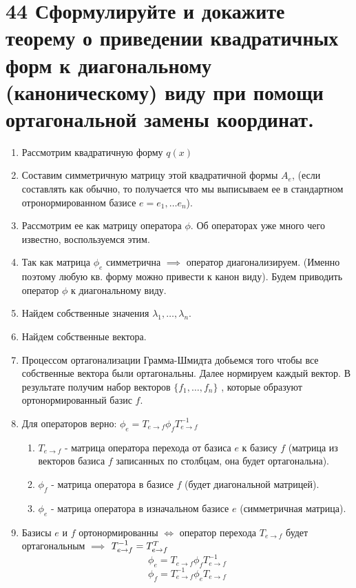 \documentclass[a4paper,12pt]{article}
\begin{document}
\section{44 Сформулируйте и докажите теорему о приведении квадратичных форм к диагональному (каноническому) виду при помощи ортагональной замены координат. }
\begin{enumerate}
\item Рассмотрим квадратичную форму $q(x)$
\item Составим симметричную матрицу этой квадратичной формы $A_e$, 
(если составлять как обычно, то получается что мы выписываем ее в стандартном отронормированном базисе $e = {e_1, \dots e_n }$).
\item Рассмотрим ее как матрицу оператора $\phi$. Об операторах уже много чего известно, воспользуемся этим.
\item Так как матрица $\phi_e$ симметрична $ \implies $ оператор диагонализируем. (Именно поэтому любую кв. форму можно привести к канон виду). Будем приводить оператор $\phi$ к диагональному виду.  
\item Найдем собственные значения $\lambda_1, \dots, \lambda_n $.
\item Найдем собственные вектора.
\item Процессом ортагонализации Грамма-Шмидта добьемся того 
чтобы все собственные вектора были ортагональны. Далее нормируем каждый вектор. 
В результате получим набор векторов $\{ f_1, \dots, f_n \}$
, которые образуют ортонормированный базис $f$.
\item Для операторов верно: {\large $\phi_e = T_{e \rightarrow f} \phi_f T_{e \rightarrow f}^{-1}$ }
\begin{enumerate}
\item[] $ T_{e \rightarrow f} $ - матрица оператора перехода от базиса $e$ к базису $f$ (матрица из векторов базиса $f$ записанных по столбцам, она будет ортагональна).
\item[] $ \phi_{f} $ - матрица оператора в базисе $f$ (будет диагональной матрицей).
\item[] $ \phi_{e} $ - матрица оператора в изначальном базисе $e$ (симметричная матрица).
\end{enumerate}
\item Базисы $e$ и $f$ ортонормированны 
$\iff $ 
оператор перехода $T_{e \rightarrow f} $ будет ортагональным
$ \implies $
$ T_{e \rightarrow f}^{-1} = T_{e \rightarrow f}^{{\small T}}  $
\[
\phi_e = T_{e \rightarrow f} \phi_f T_{e \rightarrow f}^{-1}
\]
\[
\phi_{f} = T_{e \rightarrow f}^{-1} \phi_{e} T_{e \rightarrow f}
\]
\end{enumerate}
\end{document}
